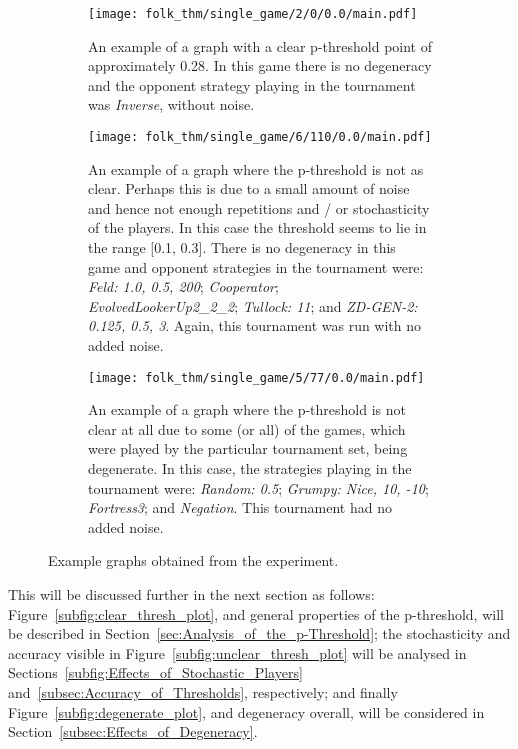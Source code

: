 \begin{figure}
    \centering
    \begin{subfigure}[0.3\textwidth]
        \centering
        \texttt{[image: folk\_thm/single\_game/2/0/0.0/main.pdf]}
        \caption{An example of a graph with a clear p-threshold point of approximately 0.28. In this game there is no degeneracy and the opponent strategy playing in the tournament was \textit{Inverse}, without noise.}
    \end{subfigure}\label{subfig:clear_thresh_plot}
    \begin{subfigure}[0.3\textwidth]
        \centering
        \texttt{[image: folk\_thm/single\_game/6/110/0.0/main.pdf]}
        \caption{An example of a graph where the p-threshold is not as clear. Perhaps this is due to a small amount of noise and hence not enough repetitions and / or stochasticity of the players. In this case the threshold seems to lie in the range [0.1, 0.3]. There is no degeneracy in this game and opponent strategies in the tournament were: \textit{Feld: 1.0, 0.5, 200}; \textit{Cooperator};  \textit{EvolvedLookerUp2_2_2}; \textit{Tullock: 11}; and \textit{ZD-GEN-2: 0.125, 0.5, 3}. Again, this tournament was run with no added noise.}
    \end{subfigure}\label{subfig:unclear_thresh_plot}
    \begin{subfigure}[0.3\textwidth]
        \centering
        \texttt{[image: folk\_thm/single\_game/5/77/0.0/main.pdf]}
        \caption{An example of a graph where the p-threshold is not clear at all due to some (or all) of the games, which were played by the particular tournament set, being degenerate. In this case, the strategies playing in the tournament were: \textit{Random: 0.5}; \textit{Grumpy: Nice, 10, -10}; \textit{Fortress3}; and \textit{Negation}. This tournament had no added noise.}
    \end{subfigure}\label{subfig:degenerate_plot}
    \caption{Example graphs obtained from the experiment.}\label{fig:example_graphs}
\end{figure}

This will be discussed further in the next section as follows:
Figure~\ref{subfig:clear_thresh_plot}, and general properties of the
p-threshold, will be described in Section~\ref{sec:Analysis_of_the_p-Threshold};
the stochasticity and accuracy visible in
Figure~\ref{subfig:unclear_thresh_plot} will be analysed in
Sections~\ref{subfig:Effects_of_Stochastic_Players}
and~\ref{subsec:Accuracy_of_Thresholds}, respectively; and finally
Figure~\ref{subfig:degenerate_plot}, and degeneracy overall, will be considered
in Section~\ref{subsec:Effects_of_Degeneracy}.

